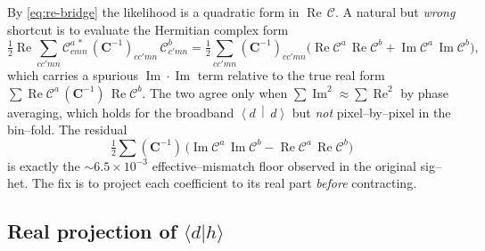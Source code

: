 \documentclass[11pt]{article}
\newcommand{\re}{\operatorname{Re}}
\newcommand{\im}{\operatorname{Im}}
\newcommand{\ip}[2]{\left\langle #1 \,\middle|\, #2 \right\rangle}
\newcommand{\cc}{c'}
\newcommand{\invC}{(\bm{C}^{-1})}
\newcommand{\Cmn}{\mathcal{C}}
\begin{document}
By \eqref{eq:re-bridge} the likelihood is a quadratic form in $\re\,\Cmn$.
A natural but \emph{wrong} shortcut is to evaluate the Hermitian complex form
\begin{equation}
\tfrac12\re\sum_{c\cc mn} \Cmn^{a\,*}_{cmn}\,\invC_{c\cc mn}\,\Cmn^{b}_{\cc mn}
  = \tfrac12\sum_{c\cc mn}\invC_{c\cc mn}
    \big(\re\Cmn^a\,\re\Cmn^b + \im\Cmn^a\,\im\Cmn^b\big),
\label{eq:hermitian}
\end{equation}
which carries a spurious $\im\!\cdot\!\im$ term relative to the true real form
$\sum \re\Cmn^a\,\invC\,\re\Cmn^b$. The two agree only when
$\sum\im^2\approx\sum\re^2$ by phase averaging, which holds for the broadband
$\ip{d}{d}$ but \emph{not} pixel--by--pixel in the bin--fold. The residual
\begin{equation}
\tfrac12\sum\invC\,\big(\im\Cmn^a\,\im\Cmn^b-\re\Cmn^a\,\re\Cmn^b\big)
\end{equation}
is exactly the $\sim\!6.5\times10^{-3}$ effective--mismatch floor observed in the
original sig--het. The fix is to project each coefficient to its real part
\emph{before} contracting.

\subsection{Real projection of $\langle d|h\rangle$}
\end{document}
